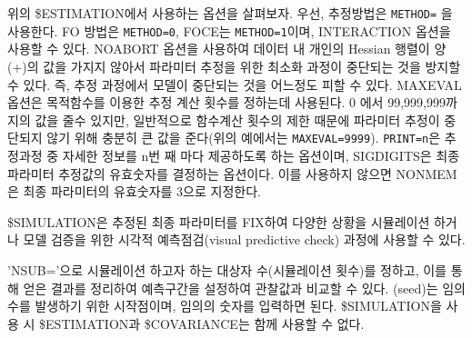 \documentclass[
  10pt,
  krantz2,
  a4paper]{krantz}
\newenvironment{Shaded}{\begin{snugshade}}{\end{snugshade}}
\newcommand{\DecValTok}[1]{\textcolor[rgb]{0.00,0.00,0.81}{#1}}
\newcommand{\KeywordTok}[1]{\textcolor[rgb]{0.13,0.29,0.53}{\textbf{#1}}}
\newcommand{\NormalTok}[1]{#1}
\newcommand{\OperatorTok}[1]{\textcolor[rgb]{0.81,0.36,0.00}{\textbf{#1}}}
\newenvironment{Shaded}{\begin{snugshade}}{\end{snugshade}}
\theoremstyle{definition}
\theoremstyle{definition}
\theoremstyle{definition}
\theoremstyle{remark}
\begin{document}
\begin{Shaded}
\end{Shaded}

위의 \$ESTIMATION에서 사용하는 옵션을 살펴보자. 우선, 추정방법은 \texttt{METHOD=} 을 사용한다. FO 방법은 \texttt{METHOD=0}, FOCE는 \texttt{METHOD=1}이며, INTERACTION 옵션을 사용할 수 있다. NOABORT 옵션을 사용하여 데이터 내 개인의 Hessian 행렬이 양(+)의 값을 가지지 않아서 파라미터 추정을 위한 최소화 과정이 중단되는 것을 방지할 수 있다. 즉, 추정 과정에서 모델이 중단되는 것을 어느정도 피할 수 있다. MAXEVAL 옵션은 목적함수를 이용한 추정 계산 횟수를 정하는데 사용된다. 0 에서 99,999,999까지의 값을 줄수 있지만, 일반적으로 함수계산 횟수의 제한 때문에 파라미터 추정이 중단되지 않기 위해 충분히 큰 값을 준다(위의 예에서는 \texttt{MAXEVAL=9999}). \texttt{PRINT=n}은 추정과정 중 자세한 정보를 n번 째 마다 제공하도록 하는 옵션이며, SIGDIGITS은 최종 파라미터 추정값의 유효숫자를 결정하는 옵션이다. 이를 사용하지 않으면 NONMEM은 최종 파라미터의 유효숫자를 3으로 지정한다.

\$SIMULATION은 추정된 최종 파라미터를 FIX하여 다양한 상황을 시뮬레이션 하거나 모델 검증을 위한 시각적 예측점검(visual predictive check) 과정에 사용할 수 있다.

\begin{Shaded}
\end{Shaded}

'NSUB='으로 시뮬레이션 하고자 하는 대상자 수(시뮬레이션 횟수)를 정하고, 이를 통해 얻은 결과를 정리하여 예측구간을 설정하여 관찰값과 비교할 수 있다. (seed)는 임의 수를 발생하기 위한 시작점이며, 임의의 숫자를 입력하면 된다. \$SIMULATION을 사용 시 \$ESTIMATION과 \$COVARIANCE는 함께 사용할 수 없다.
\end{document}
